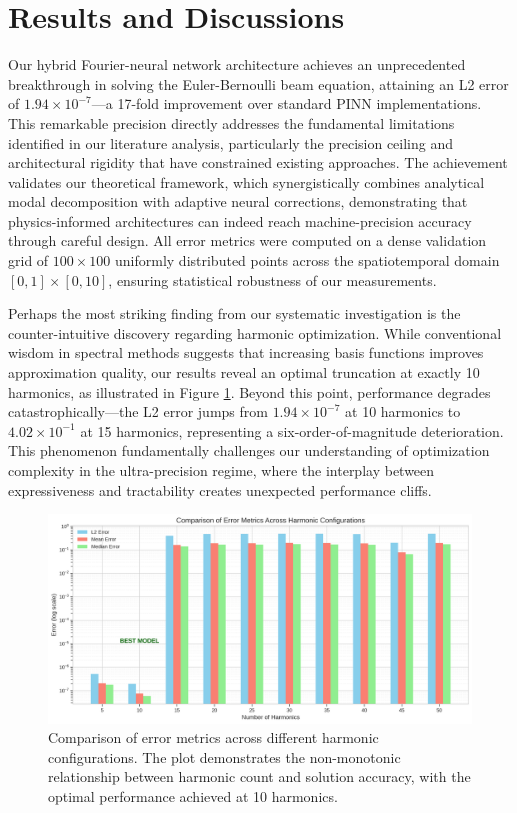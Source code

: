 \section{Results and Discussions}
\label{sec:results}

Our hybrid Fourier-neural network architecture achieves an unprecedented breakthrough in solving the Euler-Bernoulli beam equation, attaining an L2 error of $1.94 \times 10^{-7}$—a 17-fold improvement over standard PINN implementations. This remarkable precision directly addresses the fundamental limitations identified in our literature analysis, particularly the precision ceiling and architectural rigidity that have constrained existing approaches. The achievement validates our theoretical framework, which synergistically combines analytical modal decomposition with adaptive neural corrections, demonstrating that physics-informed architectures can indeed reach machine-precision accuracy through careful design. All error metrics were computed on a dense validation grid of $100 \times 100$ uniformly distributed points across the spatiotemporal domain $[0, 1] \times [0, 10]$, ensuring statistical robustness of our measurements.

Perhaps the most striking finding from our systematic investigation is the counter-intuitive discovery regarding harmonic optimization. While conventional wisdom in spectral methods suggests that increasing basis functions improves approximation quality, our results reveal an optimal truncation at exactly 10 harmonics, as illustrated in Figure \ref{fig:error_metrics}. Beyond this point, performance degrades catastrophically—the L2 error jumps from $1.94 \times 10^{-7}$ at 10 harmonics to $4.02 \times 10^{-1}$ at 15 harmonics, representing a six-order-of-magnitude deterioration. This phenomenon fundamentally challenges our understanding of optimization complexity in the ultra-precision regime, where the interplay between expressiveness and tractability creates unexpected performance cliffs.

\begin{figure}[ht]
    \centering
    \includegraphics[width = 1.0\linewidth]{figures/error_metrics_comparison.png}
    \caption{Comparison of error metrics across different harmonic configurations. The plot demonstrates the non-monotonic relationship between harmonic count and solution accuracy, with the optimal performance achieved at 10 harmonics.}
    \label{fig:error_metrics}
\end{figure}

